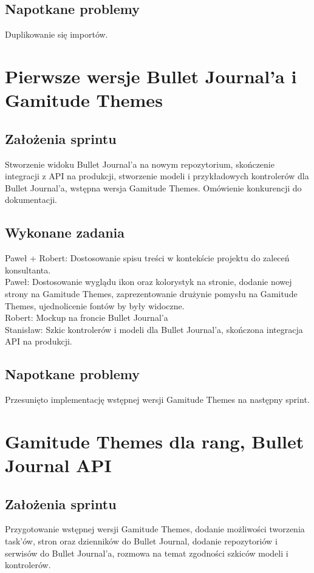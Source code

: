 \documentclass[a4paper,11pt]{report}
\begin{document}
\subsection {Napotkane problemy}
Duplikowanie się importów.

\section {Pierwsze wersje Bullet Journal'a i Gamitude Themes}
\label{sec:system_zarzadzania_dziennikami}
\subsection {Założenia sprintu}
Stworzenie widoku Bullet Journal'a na nowym repozytorium, skończenie integracji z API na produkcji, stworzenie modeli i przykładowych kontrolerów dla Bullet Journal'a, wstępna wersja Gamitude Themes. Omówienie konkurencji do dokumentacji.
\subsection {Wykonane zadania}
Paweł + Robert: Dostosowanie spisu treści w kontekście projektu do zaleceń konsultanta.\\
Paweł: Dostosowanie wyglądu ikon oraz kolorystyk na stronie, dodanie nowej strony na Gamitude Themes, zaprezentowanie drużynie pomysłu na Gamitude Themes, ujednolicenie fontów by były widoczne.\\
Robert: Mockup na froncie Bullet Journal'a\\
Stanisław: Szkic kontrolerów i modeli dla Bullet Journal'a, skończona integracja API na produkcji.\\
\subsection {Napotkane problemy}
Przesunięto implementację wstępnej wersji Gamitude Themes na następny sprint.

\section {Gamitude Themes dla rang, Bullet Journal API}
\label{sec:system_zarzadzania_stronami_dziennika}
\subsection {Założenia sprintu}
Przygotowanie wstępnej wersji Gamitude Themes, dodanie możliwości tworzenia task'ów, stron oraz dzienników do Bullet Journal, dodanie repozytoriów i serwisów do Bullet Journal'a, rozmowa na temat zgodności szkiców modeli i kontrolerów.
\end{document}
